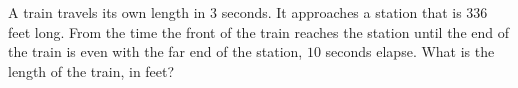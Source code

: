 A train travels its own length in $3$ seconds. It approaches a station that is $336$ feet long. From the time the front of the train reaches the station until the end of the train is even with the far end of the station, $10$ seconds elapse. What is the length of the train, in feet?
